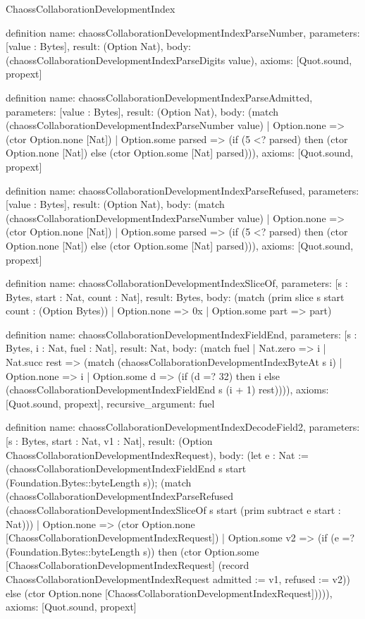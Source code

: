 \begin{lexlean}{ChaossCollaborationDevelopmentIndex}
\begin{semanticmodule}
definition{
  name: chaossCollaborationDevelopmentIndexParseNumber,
  parameters: [value : Bytes],
  result: (Option Nat),
  body: (chaossCollaborationDevelopmentIndexParseDigits value),
  axioms: [Quot.sound, propext]
}

definition{
  name: chaossCollaborationDevelopmentIndexParseAdmitted,
  parameters: [value : Bytes],
  result: (Option Nat),
  body: (match (chaossCollaborationDevelopmentIndexParseNumber value)
    | Option.none => (ctor Option.none [Nat])
    | Option.some parsed => (if (5 <? parsed) then (ctor Option.none [Nat]) else (ctor Option.some [Nat] parsed))),
  axioms: [Quot.sound, propext]
}

definition{
  name: chaossCollaborationDevelopmentIndexParseRefused,
  parameters: [value : Bytes],
  result: (Option Nat),
  body: (match (chaossCollaborationDevelopmentIndexParseNumber value)
    | Option.none => (ctor Option.none [Nat])
    | Option.some parsed => (if (5 <? parsed) then (ctor Option.none [Nat]) else (ctor Option.some [Nat] parsed))),
  axioms: [Quot.sound, propext]
}

definition{
  name: chaossCollaborationDevelopmentIndexSliceOf,
  parameters: [s : Bytes, start : Nat, count : Nat],
  result: Bytes,
  body: (match (prim slice s start count : (Option Bytes))
    | Option.none => 0x
    | Option.some part => part)
}

definition{
  name: chaossCollaborationDevelopmentIndexFieldEnd,
  parameters: [s : Bytes, i : Nat, fuel : Nat],
  result: Nat,
  body: (match fuel
    | Nat.zero => i
    | Nat.succ rest => (match (chaossCollaborationDevelopmentIndexByteAt s i)
      | Option.none => i
      | Option.some d => (if (d =? 32) then i else (chaossCollaborationDevelopmentIndexFieldEnd s (i + 1) rest)))),
  axioms: [Quot.sound, propext],
  recursive_argument: fuel
}

definition{
  name: chaossCollaborationDevelopmentIndexDecodeField2,
  parameters: [s : Bytes, start : Nat, v1 : Nat],
  result: (Option ChaossCollaborationDevelopmentIndexRequest),
  body: (let e : Nat := (chaossCollaborationDevelopmentIndexFieldEnd s start (Foundation.Bytes::byteLength s)); (match (chaossCollaborationDevelopmentIndexParseRefused (chaossCollaborationDevelopmentIndexSliceOf s start (prim subtract e start : Nat)))
    | Option.none => (ctor Option.none [ChaossCollaborationDevelopmentIndexRequest])
    | Option.some v2 => (if (e =? (Foundation.Bytes::byteLength s)) then (ctor Option.some [ChaossCollaborationDevelopmentIndexRequest] (record ChaossCollaborationDevelopmentIndexRequest {admitted := v1, refused := v2})) else (ctor Option.none [ChaossCollaborationDevelopmentIndexRequest])))),
  axioms: [Quot.sound, propext]
}


\end{semanticmodule}
\end{lexlean}
